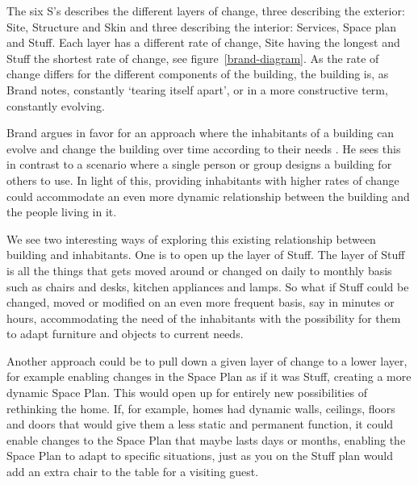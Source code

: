 The six S's describes the different layers of change, three describing the exterior: Site, Structure and Skin and three describing the interior: Services, Space plan and Stuff.
Each layer has a different rate of change, Site having the longest and Stuff the shortest rate of change, see figure~\ref{brand-diagram}.
As the rate of change differs for the different components of the building, the building is, as Brand notes, constantly `tearing itself apart', or in a more constructive term, constantly evolving.

Brand argues in favor for an approach where the inhabitants of a building can evolve and change the building over time according to their needs \citep{brandBBCvideo}.
He sees this in contrast to a scenario where a single person or group designs a building for others to use.
In light of this, providing inhabitants with higher rates of change could accommodate an even more dynamic relationship between the building and the people living in it.

We see two interesting ways of exploring this existing relationship between building and inhabitants.
One is to open up the layer of Stuff.
The layer of Stuff is all the things that gets moved around or changed on daily to monthly basis such as chairs and desks, kitchen appliances and lamps.
So what if Stuff could be changed, moved or modified on an even more frequent basis, say in minutes or hours, accommodating the need of the inhabitants with the possibility for them to adapt furniture and objects to current needs.

Another approach could be to pull down a given layer of change to a lower layer, for example enabling changes in the Space Plan as if it was Stuff, creating a more dynamic Space Plan.
This would open up for entirely new possibilities of rethinking the home. 
If, for example, homes had dynamic walls, ceilings, floors and doors that would give them a less static and permanent function, it could enable changes to the Space Plan that maybe lasts days or months, enabling the Space Plan to adapt to specific situations, just as you on the Stuff plan would add an extra chair to the table for a visiting guest. 

